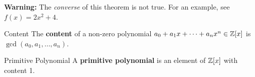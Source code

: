 \documentclass[letterpaper]{article}
\begin{document}
\textbf{Warning:} The \emph{converse} of this theorem is not true. For an example, see $f(x) = 2x^2 + 4$. 

\begin{definition}{Content}{}
    The \textbf{content} of a non-zero polynomial $a_0 + a_1 x + \dots + a_n x^n \in \mathbb{Z}[x]$ is $\gcd(a_0, a_1, \dots, a_n)$. 
\end{definition}

\begin{definition}{Primitive Polynomial}{}
    A \textbf{primitive polynomial} is an element of $\mathbb{Z}[x]$ with content 1. 
\end{definition}
\end{document}
